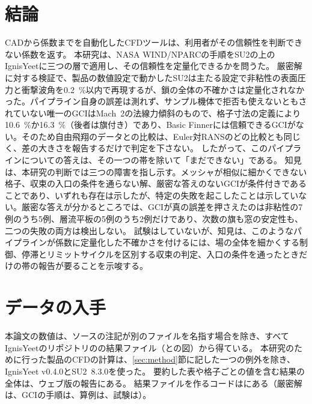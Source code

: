 \documentclass[twocolumn]{labreport}
\begin{document}
\section{結論}
\label{sec:conclusions}

CADから係数までを自動化したCFDツールは、利用者がその信頼性を判断できない係数を返す。
本研究は、NASA WIND/NPARCの手順をSU2の上のIgnisYeetに三つの層で適用し、その信頼性を定量化できるかを問うた。
厳密解に対する検証で、製品の数値設定で動かしたSU2は主たる設定で非粘性の表面圧力と衝撃波角を0.2~\%以内で再現するが、鎖の全体の不確かさは定量化されなかった。パイプライン自身の誤差は測れず、サンプル機体で拒否も使えないともされていない唯一のGCIはMach~2の法線力傾斜のもので、格子寸法の定義により10.6~\%か16.3~\%（後者は旗付き）であり、Basic Finnerには信頼できるGCIがない。そのため自由飛翔のデータとの比較は、Euler対RANSのどの比較とも同じく、差の大きさを報告するだけで判定を下さない。
したがって、このパイプラインについての答えは、その一つの帯を除いて「まだできない」である。
知見は、本研究の判断では三つの障害を指し示す。メッシャが相似に細かくできない格子、収束の入口の条件を通らない解、厳密な答えのないGCIが条件付きであることであり、いずれも存在は示したが、特定の失敗を起こしたことは示していない。厳密な答えが分かるところでは、GCIが真の誤差を押さえたのは非粘性の7例のうち5例、層流平板の5例のうち2例だけであり、次数の旗も窓の安定性も、二つの失敗の両方は検出しない。
試験はしていないが、知見は、このようなパイプラインが係数に定量化した不確かさを付けるには、場の全体を細かくする制御、停滞とリミットサイクルを区別する収束の判定、入口の条件を通ったときだけの帯の報告が要ることを示唆する。

\section*{データの入手}
本論文の数値は、ソースの注記が別のファイルを名指す場合を除き、すべてIgnisYeetのリポジトリのの結果ファイル（との図）から得ている。
本研究のために行った製品のCFDの計算は、\ref{sec:method}節に記した一つの例外を除き、IgnisYeet v0.4.0とSU2~8.3.0を使った。
要約した表や格子ごとの値を含む結果の全体は、ウェブ版の報告にある。
結果ファイルを作るコードはにある（厳密解は、GCIの手順は、算例は、試験は）。
\end{document}

